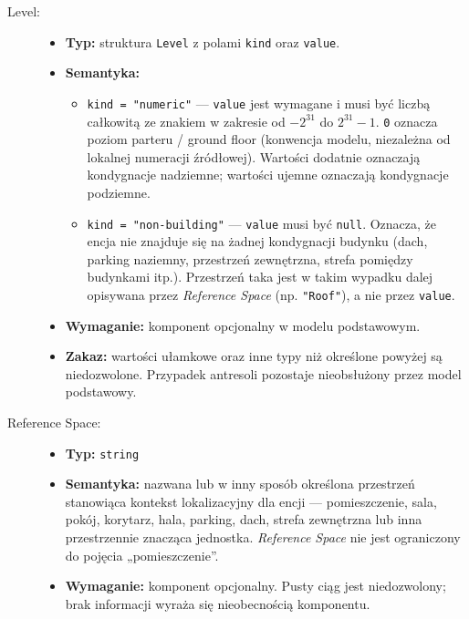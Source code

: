 \begin{description}
    \item[Level:]
    \begin{itemize}
        \item \textbf{Typ:} struktura \texttt{Level} z polami \texttt{kind} oraz \texttt{value}.
        \item \textbf{Semantyka:} 
        \begin{itemize}
            \item \texttt{kind = "numeric"} --- \texttt{value} jest wymagane i musi być liczbą całkowitą ze znakiem w zakresie od $-2^{31}$ do $2^{31}-1$. \texttt{0} oznacza poziom parteru / ground floor (konwencja modelu, niezależna od lokalnej numeracji źródłowej). Wartości dodatnie oznaczają kondygnacje nadziemne; wartości ujemne oznaczają kondygnacje podziemne.
            \item \texttt{kind = "non-building"} --- \texttt{value} musi być \texttt{null}. Oznacza, że encja nie znajduje się na żadnej kondygnacji budynku (dach, parking naziemny, przestrzeń zewnętrzna, strefa pomiędzy budynkami itp.). Przestrzeń taka jest w takim wypadku dalej opisywana przez \textit{Reference Space} (np. \texttt{"Roof"}), a nie przez \texttt{value}.
        \end{itemize}
        \item \textbf{Wymaganie:} komponent opcjonalny w modelu podstawowym.
        \item \textbf{Zakaz:} wartości ułamkowe oraz inne typy niż określone powyżej są niedozwolone. Przypadek antresoli pozostaje nieobsłużony przez model podstawowy.
    \end{itemize}

    \item[Reference Space:]
    \begin{itemize}
        \item \textbf{Typ:} \texttt{string}
        \item \textbf{Semantyka:} nazwana lub w inny sposób określona przestrzeń stanowiąca kontekst lokalizacyjny dla encji --- pomieszczenie, sala, pokój, korytarz, hala, parking, dach, strefa zewnętrzna lub inna przestrzennie znacząca jednostka. \textit{Reference Space} nie jest ograniczony do pojęcia „pomieszczenie”.
        \item \textbf{Wymaganie:} komponent opcjonalny. Pusty ciąg jest niedozwolony; brak informacji wyraża się nieobecnością komponentu.
    \end{itemize}


\end{description}
